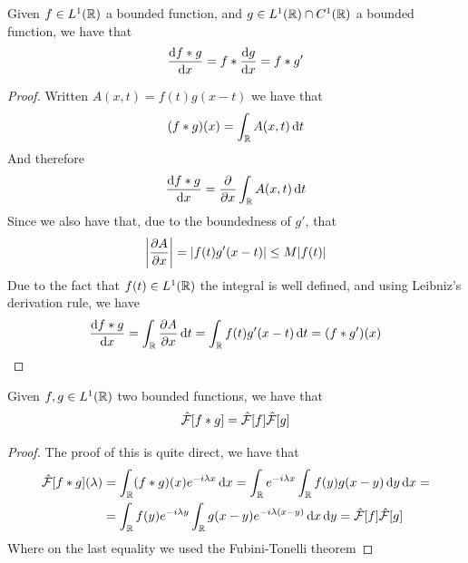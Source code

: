 \documentclass[../complete.tex]{subfiles}
\begin{document}
\begin{thm}
	Given $f\in L^1(\mathbb{R})$ a bounded function, and $g\in L^1(\mathbb{R})\cap C^1(\mathbb{R})$ a bounded function, we have that
	\begin{equation}
		\derivative{f*g}{x}=f*\derivative{g}{x}=f*g'
		\label{eq:convderiv}
	\end{equation}
\end{thm}
\begin{proof}
	Written $A(x,t)=f(t)g(x-t)$ we have that
	\begin{equation*}
		(f*g)(x)=\int_{\mathbb{R}}^{}A(x,t)\operatorname{d\!} t
	\end{equation*}
	And therefore
	\begin{equation*}
		\derivative{f*g}{x}=\pdv{x}\int_{\R}^{}A(x,t)\diff t
	\end{equation*}
	Since we also have that, due to the boundedness of $g'$, that
	\begin{equation*}
		\abs{\pdv{A}{x}}=\abs{f(t)g'(x-t)}\le M\abs{f(t)}
	\end{equation*}
	Due to the fact that $f(t)\in L^1(\mathbb{R})$ the integral is well defined, and using Leibniz's derivation rule, we have
	\begin{equation*}
		\derivative{f*g}{x}=\int_{\R}\pdv{A}{x}\diff t=\int_{\R}^{}f(t)g'(x-t)\diff t=(f*g')(x)
	\end{equation*}
\end{proof}
\begin{thm}
	Given $f,g\in L^1(\mathbb{R})$ two bounded functions, we have that
	\begin{equation}
		\hat{\mathcal{F}}[f*g]=\hat{\mathcal{F}}[f]\hat{\mathcal{F}}[g]
		\label{eq:convprodfou}
	\end{equation}
\end{thm}
\begin{proof}
	The proof of this is quite direct, we have that
	\begin{equation*}
		\begin{aligned}
			\hat{\mathcal{F}}[f*g](\lambda)&=\int_{\mathbb{R}}^{}(f*g)(x)e^{-i\lambda x}\operatorname{d\!} x=\int_{\mathbb{R}}^{}e^{-i\lambda x}\int_{\mathbb{R}}^{}f(y)g(x-y)\operatorname{d\!} y\operatorname{d\!} x=\\
			&=\int_{\mathbb{R}}^{}f(y)e^{-i\lambda y}\int_{\mathbb{R}}^{}g(x-y)e^{-i\lambda(x-y)}\operatorname{d\!} x\operatorname{d\!} y=\hat{\mathcal{F}}[f]\hat{\mathcal{F}}[g]
		\end{aligned}
	\end{equation*}
	Where on the last equality we used the Fubini-Tonelli theorem
\end{proof}
\end{document}
